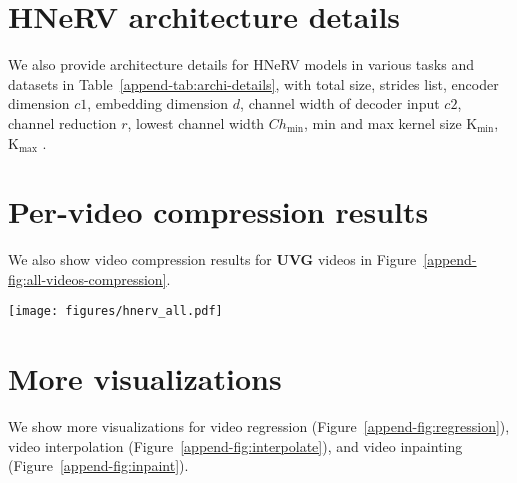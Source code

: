 \documentclass[10pt,twocolumn,letterpaper]{article}
\begin{document}
\section{HNeRV architecture details}
We also provide architecture details for HNeRV models in various tasks and datasets in 
Table~\ref{append-tab:archi-details}, with total size, strides list, encoder dimension $c1$, embedding dimension $d$, channel width of decoder input $c2$, channel reduction $r$, lowest channel width $Ch_\text{min}$, min and max kernel size K$_\text{min}$, K$_\text{max}$
.
\begin{table}[h!]
\centering
\footnotesize
\caption{HNeRV architecture details }
\label{append-tab:archi-details}
\end{table}

\section{Per-video compression results}
We also show video compression results for \textbf{UVG} videos in Figure~\ref{append-fig:all-videos-compression}.
\begin{figure*}
    \centering
      \texttt{[image: figures/hnerv\_all.pdf]}
      \caption{\textbf{Compression} results averaged across all \textbf{UVG} videos, and for each specific videos.}  
    \label{append-fig:all-videos-compression}
\end{figure*}


\section{More visualizations}
We show more visualizations for video regression (Figure~\ref{append-fig:regression}), video interpolation (Figure~\ref{append-fig:interpolate}), and video inpainting (Figure~\ref{append-fig:inpaint}).
\end{document}
